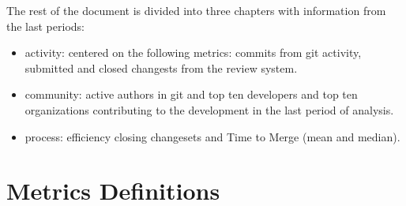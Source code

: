 \documentclass[a4wide,11pt]{report}
\begin{document}


The rest of the document is divided into three chapters with information from the last periods: 

\begin{itemize}
\item activity: centered on the following metrics: commits from git activity, submitted and closed changests from the review system. 
\item community: active authors in git and top ten developers and top ten organizations contributing to the development in the last period of analysis.
\item process: efficiency closing changesets and Time to Merge (mean and median).
\end{itemize}






\appendix{}

\chapter{Metrics Definitions}
\label{chap:metrics_definitions}
\end{document}
